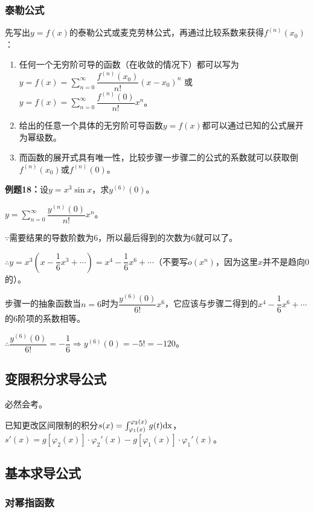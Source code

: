 \documentclass[UTF8, 12pt]{ctexart}
\begin{document}
\subsubsection{泰勒公式}

先写出$y=f(x)$的泰勒公式或麦克劳林公式，再通过比较系数来获得$f^{(n)}(x_0)$：

\begin{enumerate}
    \item 任何一个无穷阶可导的函数（在收敛的情况下）都可以写为 \\
    $y=f(x)=\sum_{n=0}^\infty\dfrac{f^{(n)}(x_0)}{n!}(x-x_0)^n$ 或 $y=f(x)=\sum_{n=0}^\infty\dfrac{f^{(n)}(0)}{n!}x^n$。
    \item 给出的任意一个具体的无穷阶可导函数$y=f(x)$都可以通过已知的公式展开为幂级数。
    \item 而函数的展开式具有唯一性，比较步骤一步骤二的公式的系数就可以获取倒$f^{(n)}(x_0)$或$f^{(n)}(0)$。
\end{enumerate}

\textbf{例题18：}设$y=x^3\sin x$，求$y^{(6)}(0)$。

$y=\sum_{n=0}^\infty\dfrac{y^{(n)}(0)}{n!}x^n$。

$\because$需要结果的导数阶数为6，所以最后得到的次数为6就可以了。

$\therefore y=x^3\left(x-\dfrac{1}{6}x^3+\cdots\right)=x^4-\dfrac{1}{6}x^6+\cdots$（不要写$o(x^n)$，因为这里$x$并不是趋向0的）。

步骤一的抽象函数当$n=6$时为$\dfrac{y^{(6)}(0)}{6!}x^6$，它应该与步骤二得到的$x^4-\dfrac{1}{6}x^6+\cdots$的6阶项的系数相等。

$\therefore \dfrac{y^{(6)}(0)}{6!}=-\dfrac{1}{6}\Rightarrow y^{(6)}(0)=-5!=-120$。

\subsection{变限积分求导公式}

必然会考。

已知更改区间限制的积分$s(x)=\int_{\varphi_1(x)}^{\varphi_2(x)}g(t)\rm{d}x$，$s'(x)=g[\varphi_2(x)]\cdot\varphi_2'(x)-g[\varphi_1(x)]\cdot\varphi_1'(x)$。

\subsection{基本求导公式}

\subsubsection{对幂指函数}
\end{document}
